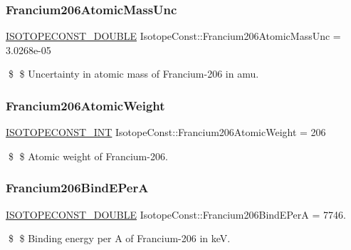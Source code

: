 \subsubsection{\texorpdfstring{Francium206\+Atomic\+Mass\+Unc}{Francium206AtomicMassUnc}}
{\footnotesize\ttfamily \mbox{\hyperlink{group___isotope_const-_macros_ga8f45a7272ce02c0b4c65c44636ed719a}{I\+S\+O\+T\+O\+P\+E\+C\+O\+N\+S\+T\+\_\+\+D\+O\+U\+B\+LE}} Isotope\+Const\+::\+Francium206\+Atomic\+Mass\+Unc = 3.\+0268e-\/05}

\$ \$ Uncertainty in atomic mass of Francium-\/206 in amu. \mbox{\label{group___isotope_const-_francium-_fr206_gad8a8204dc0905869aa5326e004394982}} 
\subsubsection{\texorpdfstring{Francium206\+Atomic\+Weight}{Francium206AtomicWeight}}
{\footnotesize\ttfamily \mbox{\hyperlink{group___isotope_const-_macros_ga5f18360b3e99483a35c32d789e62621c}{I\+S\+O\+T\+O\+P\+E\+C\+O\+N\+S\+T\+\_\+\+I\+NT}} Isotope\+Const\+::\+Francium206\+Atomic\+Weight = 206}

\$ \$ Atomic weight of Francium-\/206. \mbox{\label{group___isotope_const-_francium-_fr206_ga078bc959353bde87289603eb46b6141c}} 
\subsubsection{\texorpdfstring{Francium206\+Bind\+E\+PerA}{Francium206BindEPerA}}
{\footnotesize\ttfamily \mbox{\hyperlink{group___isotope_const-_macros_ga8f45a7272ce02c0b4c65c44636ed719a}{I\+S\+O\+T\+O\+P\+E\+C\+O\+N\+S\+T\+\_\+\+D\+O\+U\+B\+LE}} Isotope\+Const\+::\+Francium206\+Bind\+E\+PerA = 7746.}

\$ \$ Binding energy per A of Francium-\/206 in keV. \mbox{\label{group___isotope_const-_francium-_fr206_gaef6434f20731abd2ea5267df74d5144c}} 
